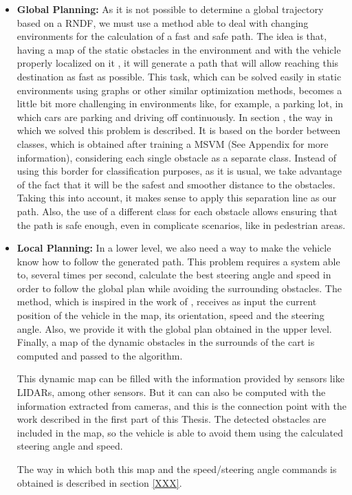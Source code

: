 \begin{itemize}
 \item \textbf{Global Planning:}
 As it is not possible to determine a global trajectory based on a \acs{RNDF}, we must use a method able to deal with changing environments for the calculation of a fast and safe path. The idea is that, having a map of the static obstacles in the environment and with the vehicle properly localized on it \cite{Perea2013mcl}, it will generate a path that will allow reaching this destination as fast as possible. This task, which can be solved easily in static environments using graphs or other similar optimization methods, becomes a little bit more challenging in environments like, for example, a parking lot, in which cars are parking and driving off continuously.
 In section \todo{ \ref{XXX} }, the way in which we solved this problem is described. It is based on the border between classes, which is obtained after training a \acf{MSVM} (See Appendix \todo {\ref{XXX}} for more information), considering each single obstacle as a separate class. Instead of using this border for classification purposes, as it is usual, we take advantage of the fact that it will be the safest and smoother distance to the obstacles. Taking this into account, it makes sense to apply this separation line as our path. Also, the use of a different class for each obstacle allows ensuring that the path is safe enough, even in complicate scenarios, like in pedestrian areas.
 
 \item \textbf{Local Planning:}
 In a lower level, we also need a way to make the vehicle know how to follow the generated path. This problem requires a system able to, several times per second, calculate the best steering angle and speed in order to follow the global plan while avoiding the surrounding obstacles. The method, which is inspired in the work of \cite{chu2012local}, receives as input the current position of the vehicle in the map, its orientation, speed and the steering angle. Also, we provide it with the global plan obtained in the upper level. Finally, a map of the dynamic obstacles in the surrounds of the cart is computed and passed to the algorithm.
 
 This dynamic map can be filled with the information provided by sensors like \acp{LIDAR}, among other sensors. But it can can also be computed with the information extracted from cameras, and this is the connection point with the work described in the first part of this Thesis. The detected obstacles are included in the map, so the vehicle is able to avoid them using the calculated steering angle and speed.
 
 The way in which both this map and the speed/steering angle commands is obtained is described in section \ref{XXX}.
\end{itemize}
 

